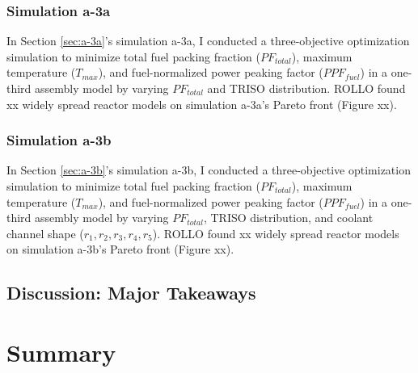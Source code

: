 \subsubsection{Simulation a-3a}
In Section \ref{sec:a-3a}'s simulation a-3a, I conducted a three-objective 
optimization simulation to minimize total fuel packing fraction ($PF_{total}$), 
maximum temperature ($T_{max}$), and fuel-normalized power peaking factor 
($PPF_{fuel}$) in a one-third assembly model by varying $PF_{total}$ and 
TRISO distribution.
\gls{ROLLO} found xx widely spread reactor models on simulation a-3a's Pareto 
front (Figure xx). 

\subsubsection{Simulation a-3b}
In Section \ref{sec:a-3b}'s simulation a-3b, I conducted a three-objective 
optimization simulation to minimize total fuel packing fraction ($PF_{total}$), 
maximum temperature ($T_{max}$), and fuel-normalized power peaking factor 
($PPF_{fuel}$) in a one-third assembly model by varying $PF_{total}$, 
TRISO distribution, and coolant channel shape ($r_1, r_2, r_3, r_4, r_5$).
\gls{ROLLO} found xx widely spread reactor models on simulation a-3b's Pareto 
front (Figure xx). 

\subsection{Discussion: Major Takeaways}

\section{Summary}

